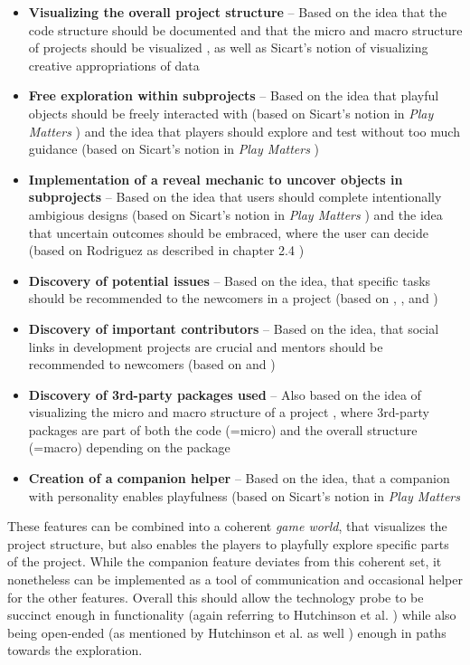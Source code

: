 \begin{itemize}
  \item{\textbf{Visualizing the overall project structure} -- Based on the idea that the code structure should be documented \cite[p. 10]{steinmacher2018let} and that the micro and macro structure of projects should be visualized \cite[p. 284]{dagenais2010moving}, as well as Sicart's notion of visualizing creative appropriations of data \cite[p. 28]{sicart2014play}}
  \item{\textbf{Free exploration within subprojects} -- Based on the idea that playful objects should be freely interacted with (based on Sicart's notion in \textit{Play Matters} \cite[p. 40]{sicart2014play}) and the idea that players should explore and test without too much guidance (based on Sicart's notion in \textit{Play Matters} \cite[p. 57]{sicart2014play})}
  \item{\textbf{Implementation of a reveal mechanic to uncover objects in subprojects} -- Based on the idea that users should complete intentionally ambigious designs (based on Sicart's notion in \textit{Play Matters} \cite[p. 31]{sicart2014play}) and the idea that uncertain outcomes should be embraced, where the user can decide (based on Rodriguez as described in chapter 2.4 \cite{rodriguez2006playful})}
  \item{\textbf{Discovery of potential issues} -- Based on the idea, that specific tasks should be recommended to the newcomers in a project (based on \cite{latoza2006maintaining}, \cite[p. 36]{yates2014onboarding}, and \cite[p. 8]{steinmacher2018let})}
  \item{\textbf{Discovery of important contributors} -- Based on the idea, that social links in development projects are crucial and mentors should be recommended to newcomers (based on \cite[p. 8]{steinmacher2018let} and \cite[p. 284]{dagenais2010moving})}
  \item{\textbf{Discovery of 3rd-party packages used} -- Also based on the idea of visualizing the micro and macro structure of a project \cite[p. 284]{dagenais2010moving}, where 3rd-party packages are part of both the code (=micro) and the overall structure (=macro) depending on the package}
  \item{\textbf{Creation of a companion helper} -- Based on the idea, that a companion with personality enables playfulness (based on Sicart's notion in \textit{Play Matters} \cite[p. 32]{sicart2014play}}
\end{itemize}

These features can be combined into a coherent \textit{game world}, that visualizes the project structure, but also enables the players to playfully explore specific parts of the project. While the companion feature deviates from this coherent set, it nonetheless can be implemented as a tool of communication and occasional helper for the other features. Overall this should allow the technology probe to be succinct enough in functionality (again referring to Hutchinson et al. \cite[p. 18]{hutchinson2003technology}) while also being open-ended (as mentioned by Hutchinson et al. as well \cite[p. 19]{hutchinson2003technology}) enough in paths towards the exploration.

